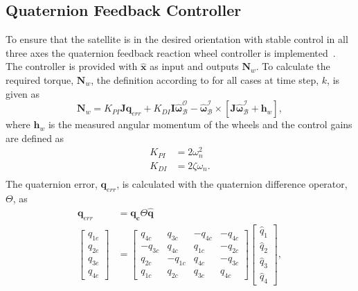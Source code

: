 \subsection{Quaternion Feedback Controller}
\label{section: Quaternion Feedback Controller}
To ensure that the satellite is in the desired orientation with stable control in all three axes the quaternion feedback reaction wheel controller is implemented~\cite{wie1989quarternion}. The controller is provided with $\mathbf{\hat{x}}$ as input and outputs $\mathbf{N}_w$. To calculate the required torque, $\mathbf{N}_{w}$, the definition according to \cite{steyn2008attitude} for all cases at time step, $k$, is given as
\begin{equation}
\mathbf{N}_{w} = K_{PI}\mathbf{Jq}_{err} + K_{DI}\mathbf{I}\hat{\boldsymbol{\omega}}_{\mathcal{B}}^{\mathcal{O}} - \hat{\boldsymbol{\omega}}_{\mathcal{B}}^{\mathcal{I}} \times \left[\mathbf{J}\hat{\boldsymbol{\omega}}_{\mathcal{B}}^{\mathcal{I}} + \mathbf{h}_{w}\right],
\end{equation}
where $\mathbf{h}_{w}$ is the measured angular momentum of the wheels and the control gains are defined as
\begin{equation}
\begin{aligned}
K_{PI} &= 2 \omega_n^2\\
K_{DI} &= 2 \zeta \omega_n. \\
\end{aligned}
\label{eq:controlGain}
\end{equation}
The quaternion error, $\mathbf{q}_{err}$, is calculated with the quaternion difference operator, $\Theta$, as
\begin{equation}
\begin{aligned}
\mathbf{q}_{err} &= \mathbf{q_c} \Theta \hat{\mathbf{q}} \\
\begin{bmatrix} 
q_{1e} \\
q_{2e} \\
q_{3e} \\
q_{4e}
\end{bmatrix} &= \begin{bmatrix} 
q_{4c} & q_{3c} & -q_{4c} & -q_{4c} \\
-q_{3c} & q_{4c} & q_{1c} & -q_{2c} \\
q_{2c} & - q_{1c} & q_{4c} & -q_{3c} \\
q_{1c} & q_{2c} & q_{3c} & q_{4c}
\end{bmatrix}
\begin{bmatrix} 
\hat{q}_1 \\
\hat{q}_2 \\
\hat{q}_3 \\
\hat{q}_4
\end{bmatrix},
\end{aligned}
\label{eq:quaternionError}
\end{equation}
